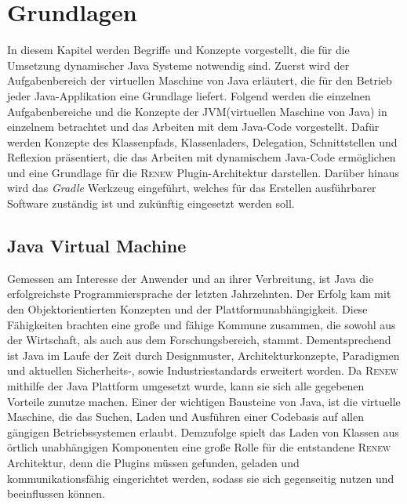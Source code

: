 \chapter{Grundlagen} \label{cha:Grundlagen}
  In diesem Kapitel werden Begriffe und Konzepte vorgestellt, die für die Umsetzung dynamischer Java Systeme notwendig sind. Zuerst wird der Aufgabenbereich der virtuellen Maschine von Java erläutert, die für den Betrieb jeder Java-Applikation eine Grundlage liefert. Folgend werden die einzelnen Aufgabenbereiche und die Konzepte der JVM(virtuellen Maschine von Java) in einzelnem betrachtet und das Arbeiten mit dem Java-Code vorgestellt. Dafür werden Konzepte des Klassenpfads, Klassenladers, Delegation, Schnittstellen und Reflexion präsentiert, die das Arbeiten mit dynamischem Java-Code ermöglichen und eine Grundlage für die \textsc{Renew} Plugin-Architektur darstellen. Darüber hinaus wird das \textit{Gradle} Werkzeug eingeführt, welches für das Erstellen ausführbarer Software zuständig ist und zukünftig eingesetzt werden soll. 

\section{Java Virtual Machine} \label{sec:JVM}

  Gemessen am Interesse der Anwender und an ihrer Verbreitung, ist Java die erfolgreichste Programmiersprache der letzten Jahrzehnten. Der Erfolg kam mit den Objektorientierten Konzepten und der Plattformunabhängigkeit. Diese Fähigkeiten brachten eine große und fähige Kommune zusammen, die sowohl aus der Wirtschaft, als auch aus dem Forschungsbereich, stammt. Dementsprechend ist Java im Laufe der Zeit durch Designmuster, Architekturkonzepte, Paradigmen und aktuellen Sicherheits-, sowie Industriestandards erweitert worden. Da \textsc{Renew} mithilfe der Java Plattform umgesetzt wurde, kann sie sich alle gegebenen Vorteile zunutze machen. \newline
  Einer der wichtigen Bausteine von Java, ist die virtuelle Maschine, die das Suchen, Laden und Ausführen einer Codebasis auf allen gängigen Betriebssystemen erlaubt. Demzufolge spielt das Laden von Klassen aus örtlich unabhängigen Komponenten eine große Rolle für die entstandene \textsc{Renew} Architektur, denn die Plugins müssen gefunden, geladen und kommunikationsfähig eingerichtet werden, sodass sie sich gegenseitig nutzen und beeinflussen können.\bigbreak


